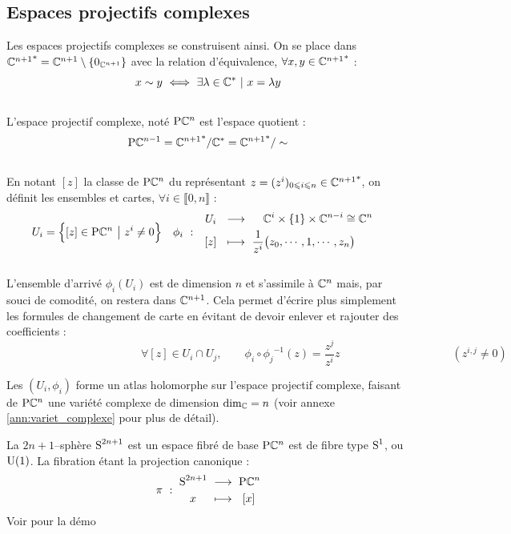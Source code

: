 \subsection{Espaces projectifs complexes}

Les espaces projectifs complexes se construisent ainsi. On se place dans ${\C^{n+1}}^*=\C^{n+1}\setminus\{0_{\C^{n+1}}\}$ avec la relation d'équivalence, $\forall x,y\in{\C^{n+1}}^*$ :
\[x \sim y\ \Llr\ \exists \lambda\in\C^*\ |\ x=\lambda y\]
\\
L'espace projectif complexe, noté $\PC{n}$ est l'espace quotient :
\[\PC{n-1} = {\C^{n+1}}^*/\C^* = {\C^{n+1}}^*/\sim\]
\\
En notant $[z]$ la classe de $\PC{n}$ du représentant $z = (z^i)_{0\leq i\leq n}\in{\C^{n+1}}^*$, on définit les ensembles et cartes, $\forall i\in\llbracket0,n\rrbracket$ :
\begin{align}
	U_i &= \Big\{[z]\in\PC{n}\ \big|\ z^i\neq 0\Big\}  &  \phi_i\  :\quad &\begin{aligned}
		U_i\ \ &\lr\quad\ \C^{i}\times \{1\} \times\C^{n-i}\cong \C^{n} \\ [z]\ \ &\lmt\ \frac{1}{z^i}\big(z_0,\cdots, 1,\cdots, z_n\big)
	\end{aligned}
\end{align}
\\
L'ensemble d'arrivé $\phi_i(U_i)$ est de dimension $n$ et s'assimile à $\C^{n}$ mais, par souci de comodité, on restera dans $\C^{n+1}$. Cela permet  d'écrire plus simplement les formules de changement de carte en évitant de devoir enlever et rajouter des coefficients :
\[\qquad\qquad\qquad\qquad\qquad\qquad \forall [z]\in U_i\cap U_j,\qquad \phi_i \circ {\phi_j}^{-1}(z) = \frac{z^j}{z^i}z\qquad\qquad\qquad\qquad\qquad (z^{i,j}\neq 0) \qquad\]

Les $(U_i,\phi_i)$ forme un atlas holomorphe sur l'espace projectif complexe, faisant de $\PC{n}$ une variété complexe de dimension $\dim[\C] = n$ (voir annexe \ref{ann:variet_complexe} pour plus de détail).

\begin{proposition}
	La $2n+1$--sphère $\S{2n+1}$ est un espace fibré de base $\PC{n}$ est de fibre type $\S{1}$, ou $\U{1}$. La fibration étant la projection canonique :
	\[\pi\ :\ \begin{aligned}\S{2n+1}\ &\lr\ \PC{n} \\ x\quad\ &\lmt\ \ [x]\end{aligned}\]
	Voir \cite{lafontaine_introduction_2015} pour la démo
\end{proposition}


